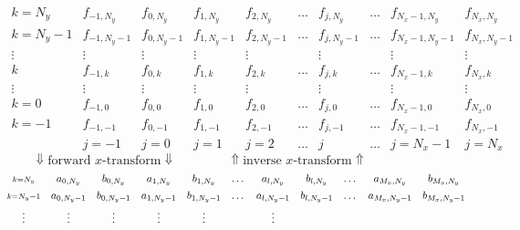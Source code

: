 \documentclass[12pt]{article}
\begin{document}
\renewcommand{\ss}[1]{{\scriptstyle #1}}
\begin{figure}
\begin{displaymath}
\begin{matrix}
\ss{k=N_y}  & f_{-1,N_y} & f_{0,N_y} & f_{1,N_y} & f_{2,N_y} & \dots &
f_{j,N_y} & \dots & f_{N_x-1,N_y} & f_{N_x,N_y} 
\\[4pt]
\ss{k=N_y-1}  & f_{-1,N_y-1} & f_{0,N_y-1} & f_{1,N_y-1} & f_{2,N_y-1} & \dots &
f_{j,N_y-1} & \dots & f_{N_x-1,N_y-1} & f_{N_x,N_y-1} 
\\[4pt]
\vdots  & \vdots & \vdots & \vdots & \vdots & & \vdots & 
& \vdots & \vdots 
\\[4pt]
\ss{k}  & f_{-1,k} & f_{0,k} & f_{1,k} & f_{2,k} & \dots & f_{j,k} & \dots
& f_{N_x-1,k} & f_{N_x,k} 
\\[4pt]
\vdots  & \vdots & \vdots & \vdots & \vdots & & \vdots & 
& \vdots & \vdots 
\\[4pt]
\ss{k=0}  & f_{-1,0} & f_{0,0} & f_{1,0} & f_{2,0} & \dots & f_{j,0} & \dots
& f_{N_x-1,0} & f_{N_x,0} 
\\[4pt]
\ss{k=-1}  & f_{-1,-1} & f_{0,-1} & f_{1,-1} & f_{2,-1} & \dots & f_{j,-1} & \dots
& f_{N_x-1,-1} & f_{N_x,-1} 
\\[6pt]
   & \ss{j=-1} & \ss{j=0} & \ss{j=1} & \ss{j=2} & \dots & \ss{j} & \dots &
\ss{j=N_x-1} & \ss{j=N_x} 
\end{matrix}
\end{displaymath}
\begin{displaymath}
   \Downarrow\text{forward $x$-transform} \Downarrow 
   \qquad \qquad 
   \Uparrow \text{inverse $x$-transform} \Uparrow
\end{displaymath}
\begin{displaymath}
\setcounter{MaxMatrixCols}{12}
\begin{matrix}
\ss{k=N_y}  & a_{0,N_y} & b_{0,N_y} & a_{1,N_y} & b_{1,N_y} & \dots &
a_{l,N_y} & b_{l,N_y} & \dots & a_{M_x,N_y} & b_{M_x,N_y} 
\\[4pt]
\ss{k=N_y-1}  & a_{0,N_y-1} & b_{0,N_y-1} & a_{1,N_y-1} & b_{1,N_y-1} & \dots &
a_{l,N_y-1} & b_{l,N_y-1} & \dots & a_{M_x,N_y-1} & b_{M_x,N_y-1} 
\\[4pt]
\vdots  & \vdots & \vdots & \vdots & \vdots & & \vdots & 

\end{matrix}
\end{displaymath}
\end{figure}
\end{document}
